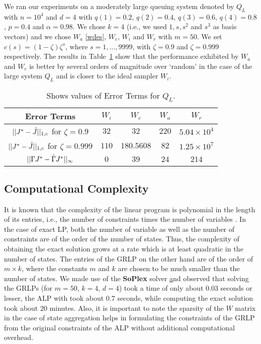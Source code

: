 We ran our experiments on a moderately large queuing system denoted by $Q_L$ with $n=10^4$ and $d=4$ with $q(1)=0.2$, $q(2)=0.4$, $q(3)=0.6$, $q(4)=0.8$, $p=0.4$ and $\alpha=0.98$. We chose $k=4$ (i.e., we used $1, s,s^2$ and $s^3$ as basis vectors) and we chose $W_a$ \eqref{wdes}, $W_c$, $W_i$ and $W_r$ with $m=50$. We set $c(s)=(1-\zeta) \zeta^s$, where $s=1,\ldots,9999$, with $\zeta=0.9$ and $\zeta=0.999$ respectively. The results in Table~\ref{pref} show that the performance exhibited by $W_a$ and $W_c$ is better by several orders of magnitude over `random' in the case of the large system $Q_L$ and is closer to the ideal sampler $W_i$.
\FloatBarrier
\begin{table}[H]
\begin{center}
\begin{tabular}{|c|c|c|c|c|}\hline
Error Terms&	$W_i$&	$W_c$& $W_a$& $W_r$ \\\hline
$||J^*-\hat{J}||_{1,c}$ for $\zeta=0.9$& $32$&	$32$& $220$& $5.04\times 10^4$ \\\hline
$||J^*-\hat{J}||_{1,c}$ for $\zeta=0.999$& $110$&	$180.5608$& $82$& $1.25\times 10^7$ \\\hline
$||\Gamma J^*-\hat{\Gamma} J^*||_\infty$ & $0$&	$39$& $24$& $214$ \\\hline
\end{tabular}
\end{center}
\caption{Shows values of Error Terms for $Q_L$.}
\label{pref}
\end{table}
\subsection{Computational Complexity}
It is known that the complexity of the linear program is polynomial in the length of its entries, i.e., the number of constraints times the number of variables \cite{karmarkar,adler}. 
In the case of exact LP, both the number of variable as well as the number of constraints are of the order of the number of states. Thus, the complexity of obtaining the exact solution grows at a rate which is at least quadratic in the number of states. The entries of the GRLP on the other hand are of the order of $m\times k$,  where the constants $m$ and $k$ are chosen to be much smaller than the number of states. We made use of the \textbf{SoPlex} solver \href{http://soplex.zib.de/} and observed that solving the GRLPs (for $m=50$, $k=4$, $d=4$) took a time of only about $0.03$ seconds or lesser, the ALP with took about $0.7$ seconds, while computing the exact solution took about $20$ minutes.
 Also, it is important to note the sparsity of the $W$ matrix in the case of state aggregation helps in formulating the constraints of the GRLP from the original constraints of the ALP without additional computational overhead.

